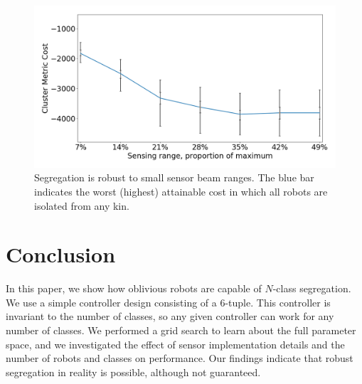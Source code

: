 \documentclass[conference]{IEEEtran}
\newtheorem{theorem}{Theorem}
\begin{document}
\begin{figure}[t]
  \centering
  \includegraphics[width=1\linewidth]{./images/beam_length.png}
  \caption{Segregation is robust to small sensor beam ranges. The blue bar
    indicates the worst (highest) attainable cost in which all robots are
    isolated from any kin.}
  \label{fig:beam_range}
\end{figure}

\section{Conclusion}

In this paper, we show how oblivious robots are capable of $N$-class
segregation. We use a simple controller design consisting of a 6-tuple. This
controller is invariant to the number of classes, so any given controller can
work for any number of classes. We performed a grid search to learn about the
full parameter space, and we investigated the effect of sensor implementation
details and the number of robots and classes on performance. Our findings
indicate that robust segregation in reality is possible, although not
guaranteed.







\end{document}
